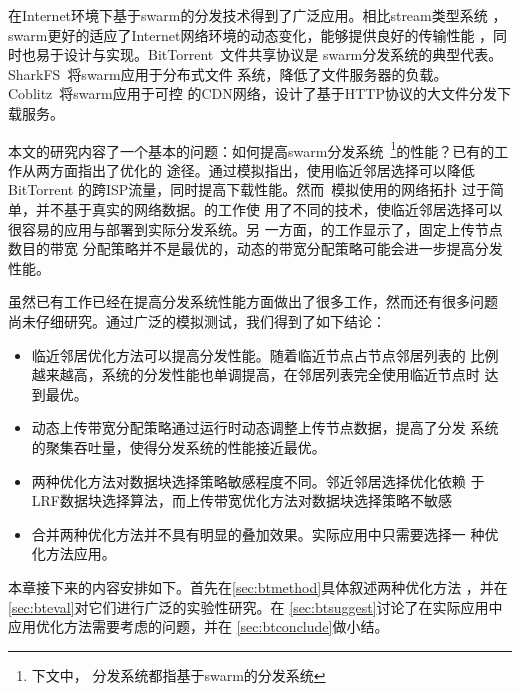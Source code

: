 在Internet环境下基于swarm的分发技术得到了广泛应用。相比stream类型系统
，swarm更好的适应了Internet网络环境的动态变化，能够提供良好的传输性能
，同时也易于设计与实现。BitTorrent~\cite{bittorrent}文件共享协议是
swarm分发系统的典型代表。SharkFS~\cite{sharkfs}将swarm应用于分布式文件
系统，降低了文件服务器的负载。Coblitz~\cite{coblitz}将swarm应用于可控
的CDN网络，设计了基于HTTP协议的大文件分发下载服务。

本文的研究内容了一个基本的问题：如何提高swarm分发系统~\footnote{下文中，
分发系统都指基于swarm的分发系统}的性能？已有的工作从两方面指出了优化的
途径。通过模拟指出，使用临近邻居选择可以降低BitTorrent
的跨ISP流量，同时提高下载性能。然而~模拟使用的网络拓扑
过于简单，并不基于真实的网络数据。的工作使
用了不同的技术，使临近邻居选择可以很容易的应用与部署到实际分发系统。另
一方面，的工作显示了，固定上传节点数目的带宽
分配策略并不是最优的，动态的带宽分配策略可能会进一步提高分发性能。


虽然已有工作已经在提高分发系统性能方面做出了很多工作，然而还有很多问题
尚未仔细研究。通过广泛的模拟测试，我们得到了如下结论：


\begin{itemize}

  \item 临近邻居优化方法可以提高分发性能。随着临近节点占节点邻居列表的
  比例越来越高，系统的分发性能也单调提高，在邻居列表完全使用临近节点时
  达到最优。

  \item 动态上传带宽分配策略通过运行时动态调整上传节点数据，提高了分发
  系统的聚集吞吐量，使得分发系统的性能接近最优。

  \item 两种优化方法对数据块选择策略敏感程度不同。邻近邻居选择优化依赖
  于LRF数据块选择算法，而上传带宽优化方法对数据块选择策略不敏感

  \item 合并两种优化方法并不具有明显的叠加效果。实际应用中只需要选择一
  种优化方法应用。
\end{itemize}

本章接下来的内容安排如下。首先在\ref{sec:btmethod}具体叙述两种优化方法
，并在\ref{sec:bteval}对它们进行广泛的实验性研究。在
\ref{sec:btsuggest}讨论了在实际应用中应用优化方法需要考虑的问题，并在
\ref{sec:btconclude}做小结。


